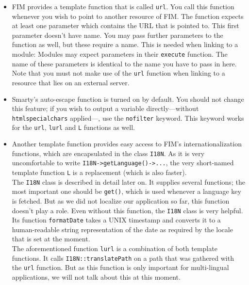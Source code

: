 \documentclass{scrartcl}
\begin{document}
      \begin{itemize}
         \item
            FIM provides a template function that is called \texttt{url}. You call this
            function whenever you wish to point to another resource of FIM. The function expects at least one parameter which contains the URL that is pointed to. This first parameter doesn't have name. You may pass further parameters to the function as well, but these require a name. This is needed when linking to a module: Modules may expect parameters in their \lstinline!execute! function. The name of these parameters is identical to the name you have to pass in here. \\
            Note that you must not make use of the \texttt{url} function when linking to a resource that lies on an external server.
         \item
            Smarty's auto-escape function is turned on by default. You should not change this feature; if you wish to output a variable directly---without \lstinline!htmlspecialchars! applied---, use the \texttt{nofilter} keyword. This keyword works for the \texttt{url}, \texttt{lurl} and \texttt{L} functions as well.
         \item
            Another template function provides easy access to FIM's internationalization functions, which are encapsulated in the class \lstinline!I18N!. As it is very uncomfortable to write \lstinline!I18N->getLanguage()->...!, the very short-named template function \texttt{L} is a replacement (which is also faster). \\
            The \lstinline!I18N! class is described in detail later on. It supplies several functions; the most important one should be \lstinline!get()!, which is used whenever a language key is fetched. But as we did not localize our application so far, this function doesn't play a role. Even without this function, the \lstinline!I18N! class is very helpful. Its function \lstinline!formatDate! takes a UNIX timestamp and converts it to a human-readable string representation of the date as required by the locale that is set at the moment. \\
            The aforementioned function \texttt{lurl} is a combination of both template functions. It calls \lstinline!I18N::translatePath! on a path that was gathered with the \texttt{url} function. But as this function is only important for multi-lingual applications, we will not talk about this at this moment.
      \end{itemize}
\end{document}
